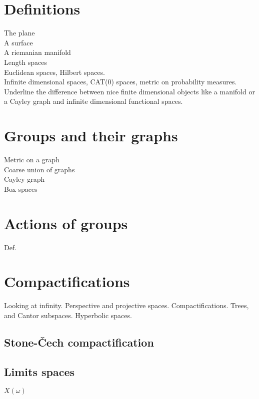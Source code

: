\section{Definitions}

The plane\\
A surface\\
A riemanian manifold\\
Length spaces\\

Euclidean spaces, Hilbert spaces.\\
Infinite dimensional spaces, CAT(0) spaces, metric on probability measures.\\

Underline the difference between nice finite dimensional objects like a manifold or a Cayley graph and infinite dimensional functional spaces.

\section{Groups and their graphs}

Metric on a graph \\
Coarse union of graphs\\

Cayley graph\\
Box spaces

\section{Actions of groups}

Def.

\section{Compactifications}
 
Looking at infinity. Perspective and projective spaces. Compactifications. Trees, and Cantor subspaces. Hyperbolic spaces.
 
\subsection{Stone-\v{C}ech compactification}

\subsection{Limits spaces}

$X(\omega)$ \\

